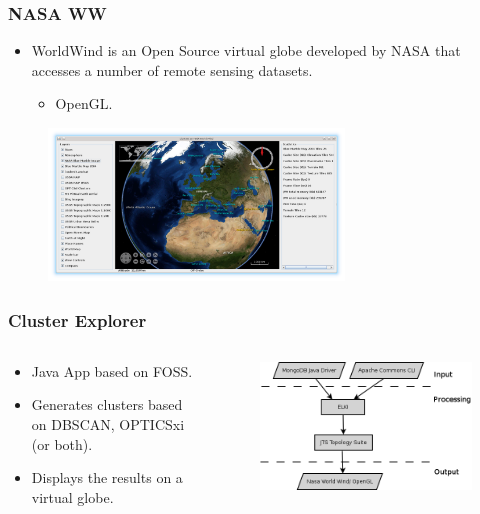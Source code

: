 \documentclass[hyperref={pdfpagelabels=true}]{beamer}
\begin{document}
\begin{frame}
\frametitle{NASA WW}
    \begin{itemize}
      \item<1->WorldWind is an Open Source virtual globe developed by NASA that accesses a number of remote sensing datasets.%
      \begin{itemize}
	  \item<2->OpenGL.%
       \end{itemize}
      \end{itemize}
      \begin{figure}  
	\includegraphics[width=0.7\textwidth]{bluemarble.png}
       \end{figure}  
\end{frame}


\begin{frame}
\frametitle{Cluster Explorer}
\begin{columns}
  \begin{column}{0.4\textwidth}
    \begin{itemize}
      \item<1->Java App based on FOSS.
      \item<2->Generates clusters based on DBSCAN, OPTICSxi (or both). 
      \item<3->Displays the results on a virtual globe.
      \end{itemize}      
  \end{column}
  \begin{column}{0.6\textwidth}      
      \begin{figure}  
	\includegraphics[width=\textwidth]{flowchart.png}
       \end{figure}  
  \end{column}       
\end{columns}  
\end{frame}
\end{document}
